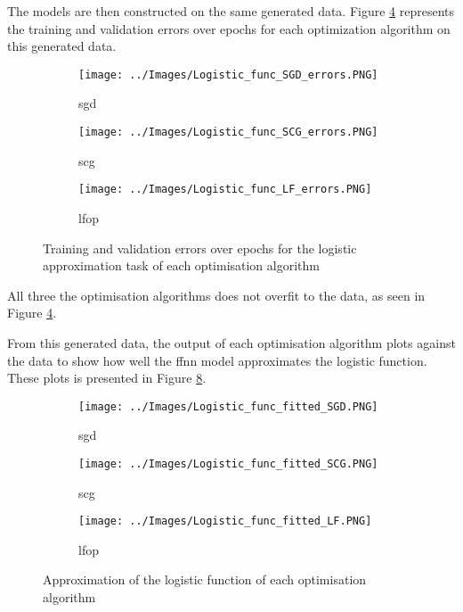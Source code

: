 \documentclass[10pt, conference]{IEEEtran}
\begin{document}
The models are then constructed on the same generated data. Figure \ref{fig:Logistic_errors} represents
the training and validation errors over epochs for each optimization algorithm on this generated data.
\begin{figure}[H]
    \centering
    \begin{subfigure}[b]{0.23\textwidth}
        \centering
        \texttt{[image: ../Images/Logistic\_func\_SGD\_errors.PNG]}
        \caption{\acrshort{sgd}}
        \label{fig:Logistic_func_SGD_errors}
    \end{subfigure}
    \hfill
    \begin{subfigure}[b]{0.23\textwidth}
        \centering
        \texttt{[image: ../Images/Logistic\_func\_SCG\_errors.PNG]}
        \caption{\acrshort{scg}}
        \label{fig:Logistic_func_SCG_errors}
    \end{subfigure}
    \begin{subfigure}[b]{0.23\textwidth}
        \centering
        \texttt{[image: ../Images/Logistic\_func\_LF\_errors.PNG]}
        \caption{\acrshort{lfop}}
        \label{fig:Logistic_func_LF_errors}
    \end{subfigure}
    \caption{Training and validation errors over epochs for the logistic approximation task of each optimisation algorithm}
    \label{fig:Logistic_errors}
\end{figure}
All three the optimisation algorithms does not overfit to the data, as seen in Figure \ref{fig:Logistic_errors}.

From this generated data, the output of each optimisation algorithm plots against
the data to show how well the \acrshort{ffnn} model approximates the logistic function.
These plots is presented in Figure \ref{fig:Logistic_approximation}.
\begin{figure}[H]
    \centering
    \begin{subfigure}[b]{0.23\textwidth}
        \centering
        \texttt{[image: ../Images/Logistic\_func\_fitted\_SGD.PNG]}
        \caption{\acrshort{sgd}}
        \label{fig:Logistic_func_SGD_approximation}
    \end{subfigure}
    \hfill
    \begin{subfigure}[b]{0.23\textwidth}
        \centering
        \texttt{[image: ../Images/Logistic\_func\_fitted\_SCG.PNG]}
        \caption{\acrshort{scg}}
        \label{fig:Logistic_func_SCG_approximation}
    \end{subfigure}
    \begin{subfigure}[b]{0.23\textwidth}
        \centering
        \texttt{[image: ../Images/Logistic\_func\_fitted\_LF.PNG]}
        \caption{\acrshort{lfop}}
        \label{fig:Logistic_func_LF_approximation}
    \end{subfigure}
    \caption{Approximation of the logistic function of each optimisation algorithm}
    \label{fig:Logistic_approximation}
\end{figure}
\end{document}
